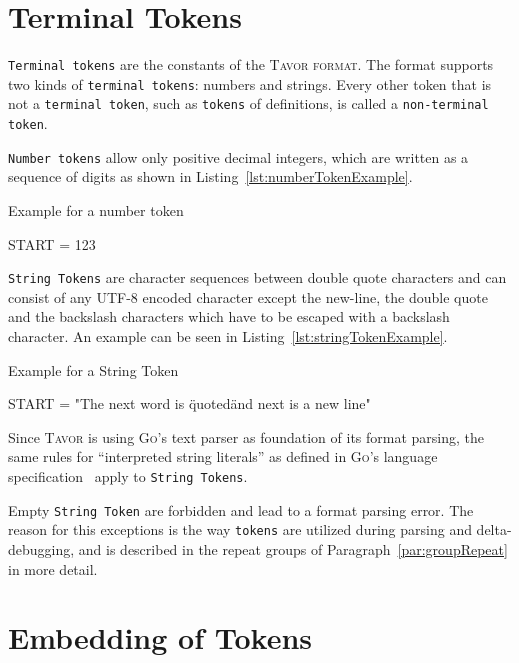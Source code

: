 \section{Terminal Tokens}
\label{sec:terminalTokens}

\texttt{Terminal tokens} are the constants of the \textsc{Tavor format}. The format supports two kinds of \texttt{terminal tokens}: numbers and strings. Every other token that is not a \texttt{terminal token}, such as \texttt{tokens} of definitions, is called a \texttt{non-terminal token}.

\texttt{Number tokens} allow only positive decimal integers, which are written as a sequence of digits as shown in Listing~\ref{lst:numberTokenExample}.

\begin{listing}
\caption{Example for a number token}
\label{lst:numberTokenExample}
\begin{gocode}
START = 123
\end{gocode}
\end{listing}

\texttt{String Tokens} are character sequences between double quote characters and can consist of any UTF-8 encoded character except the new-line, the double quote and the backslash characters which have to be escaped with a backslash character. An example can be seen in Listing~\ref{lst:stringTokenExample}.

\begin{listing}
\caption{Example for a String Token}
\label{lst:stringTokenExample}
\begin{gocode}
START = "The next word is \"quoted\" and next is a new line\n"
\end{gocode}
\end{listing}

Since \textsc{Tavor} is using \textsc{Go}'s text parser as foundation of its format parsing, the same rules for \enquote{interpreted string literals} as defined in \textsc{Go}'s language specification~\cite{2017_go_spec} apply to \texttt{String Tokens}.

Empty \texttt{String Token} are forbidden and lead to a format parsing error. The reason for this exceptions is the way \texttt{tokens} are utilized during parsing and delta-debugging, and is described in the repeat groups of Paragraph~\ref{par:groupRepeat} in more detail.

\section{Embedding of Tokens}
\label{sec:tokenEmbedding}

